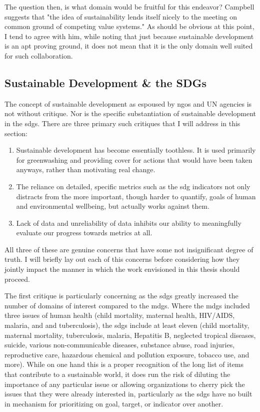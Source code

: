 The question then, is what domain would be fruitful for this endeavor? Campbell suggests that "the idea of sustainability lends itself nicely to the meeting on common ground of competing value systems." As should be obvious at this point, I tend to agree with him, while noting that just because sustainable development is an apt proving ground, it does not mean that it is the only domain well suited for such collaboration.

\subsection{Sustainable Development \& the SDGs} \label{sec:sdg_critique}

The concept of sustainable development as espoused by \acp{ngo} and UN agencies is not without critique. Nor is the specific substantiation of sustainable development in the \acp{sdg}. There are three primary such critiques that I will address in this section:

\begin{enumerate} \setlength{\itemsep}{0pt} \setlength{\parskip}{0pt}
	\item Sustainable development has become essentially toothless. It is used primarily for greenwashing and providing cover for actions that would have been taken anyways, rather than motivating real change.
	\item The reliance on detailed, specific metrics such as the \ac{sdg} indicators not only distracts from the more important, though harder to quantify, goals of human and environmental wellbeing, but actually works against them. 
	\item Lack of data and unreliability of data inhibits our ability to meaningfully evaluate our progress towards metrics at all.
\end{enumerate}

All three of these are genuine concerns that have some not insignificant degree of truth. I will briefly lay out each of this concerns before considering how they jointly impact the manner in which the work envisioned in this thesis should proceed.

The first critique is particularly concerning as the \acp{sdg} greatly increased the number of domains of interest compared to the \acp{mdg}. Where the \acp{mdg} included three issues of human health (child mortality, maternal health, HIV/AIDS, malaria, and and tuberculosis), the \acp{sdg} include at least eleven (child mortality, maternal mortality, tuberculosis, malaria, Hepatitis B, neglected tropical diseases, suicide, various non-communicable diseases, substance abuse, road injuries, reproductive care, hazardous chemical and pollution exposure, tobacco use, and more). While on one hand this is a proper recognition of the long list of items that contribute to a sustainable world, it does run the risk of diluting the importance of any particular issue or allowing organizations to cherry pick the issues that they were already interested in, particularly as the \acp{sdg} have no built in mechanism for prioritizing on goal, target, or indicator over another.  

